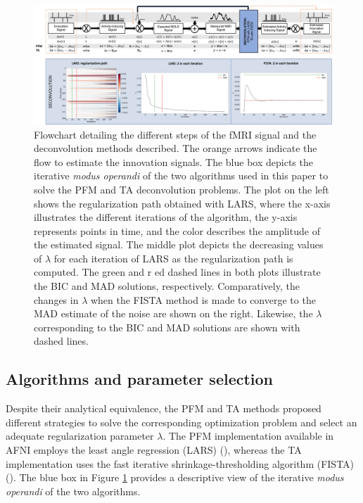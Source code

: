 \begin{figure}[t!]
    \begin{center}
        \includegraphics[width=\columnwidth]{figures/flowchart.pdf}
    \end{center}
    \caption{Flowchart detailing the different steps of the fMRI signal and the deconvolution methods described. The orange arrows indicate the flow to estimate the innovation signals. The blue box depicts the iterative \textit{modus operandi} of the two algorithms used in this paper to solve the PFM and TA deconvolution problems. The plot on the left shows the regularization path obtained with LARS, where the x-axis illustrates the different iterations of the algorithm, the y-axis represents points in time, and the color describes the amplitude of the estimated signal. The middle plot depicts the decreasing values of $\lambda$ for each iteration of LARS as the regularization path is computed. The green and r ed dashed lines in both plots illustrate the BIC and MAD solutions, respectively. Comparatively, the changes in $\lambda$ when the FISTA method is made to converge to the MAD estimate of the noise are shown on the right. Likewise, the $\lambda$ corresponding to the BIC and MAD solutions are shown with dashed lines.}
\label{fig:flowchart}
\end{figure}

\subsection{Algorithms and parameter selection}
\label{sec:regparam}
Despite their analytical equivalence, the PFM and TA methods proposed different strategies to solve the corresponding optimization problem and select an adequate regularization parameter $\lambda$. The PFM implementation available in AFNI employs the least angle regression (LARS) (\citealt{Efron2004Leastangleregression}), whereas the TA implementation uses the fast iterative shrinkage-thresholding algorithm (FISTA) (\citealt{Beck2009FastIterativeShrinkage}). The blue box in Figure \ref{fig:flowchart} provides a descriptive view of the iterative \textit{modus operandi} of the two algorithms.

